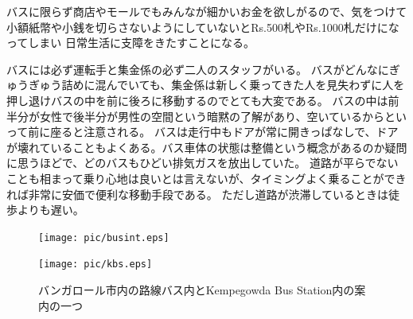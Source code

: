 バスに限らず商店やモールでもみんなが細かいお金を欲しがるので、気をつけて小額紙幣や小銭を切らさないようにしていないとRs.500札やRs.1000札だけになってしまい
日常生活に支障をきたすことになる。
\par
バスには必ず運転手と集金係の必ず二人のスタッフがいる。
バスがどんなにぎゅうぎゅう詰めに混んでいても、集金係は新しく乗ってきた人を見失わずに人を押し退けバスの中を前に後ろに移動するのでとても大変である。
バスの中は前半分が女性で後半分が男性の空間という暗黙の了解があり、空いているからといって前に座ると注意される。
バスは走行中もドアが常に開きっぱなしで、ドアが壊れていることもよくある。バス車体の状態は整備という概念があるのか疑問に思うほどで、どのバスもひどい排気ガスを放出していた。
道路が平らでないことも相まって乗り心地は良いとは言えないが、タイミングよく乗ることができれば非常に安価で便利な移動手段である。
ただし道路が渋滞しているときは徒歩よりも遅い。
\begin{figure}[ht]
  \begin{minipage}{0.5\hsize}
  \begin{center}
    \texttt{[image: pic/busint.eps]}
  \end{center}
  \end{minipage}
  \begin{minipage}{0.5\hsize}
  \begin{center}
    \texttt{[image: pic/kbs.eps]}
  \end{center}
  \end{minipage}
  \caption{バンガロール市内の路線バス内とKempegowda Bus Station内の案内の一つ}
  \label{bus}
\end{figure}

